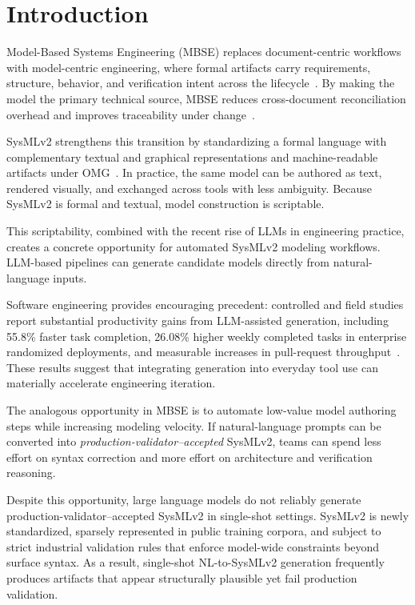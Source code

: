 \documentclass[colorlinks,upint,subscriptcorrection,varvw,hyphenate,balance]{asmeconf} %
\begin{document}

\section{Introduction}
Model-Based Systems Engineering (MBSE) replaces document-centric workflows with model-centric engineering, where formal artifacts carry requirements, structure, behavior, and verification intent across the lifecycle~\cite{estefan2007mbseSurvey,madni2018mbse,incoseMbseInitiative2025,sebokMBSE2025}. By making the model the primary technical source, MBSE reduces cross-document reconciliation overhead and improves traceability under change~\cite{madni2018mbse,incoseSEVision2035}.

SysMLv2 strengthens this transition by standardizing a formal language with complementary textual and graphical representations and machine-readable artifacts under OMG~\cite{omgSysMLv2Spec2024,omgSysMLv2About2025,omgSysMLv2FinalAdoption2025}. In practice, the same model can be authored as text, rendered visually, and exchanged across tools with less ambiguity. Because SysMLv2 is formal and textual, model construction is scriptable.

This scriptability, combined with the recent rise of LLMs in engineering practice, creates a concrete opportunity for automated SysMLv2 modeling workflows. LLM-based pipelines can generate candidate models directly from natural-language inputs.

Software engineering provides encouraging precedent: controlled and field studies report substantial productivity gains from LLM-assisted generation, including 55.8\% faster task completion, 26.08\% higher weekly completed tasks in enterprise randomized deployments, and measurable increases in pull-request throughput~\cite{peng2023copilot,cui2025highSkilled,demirer2024fieldCopilot}. These results suggest that integrating generation into everyday tool use can materially accelerate engineering iteration.

The analogous opportunity in MBSE is to automate low-value model authoring steps while increasing modeling velocity. If natural-language prompts can be converted into \emph{production-validator--accepted} SysMLv2, teams can spend less effort on syntax correction and more effort on architecture and verification reasoning.

Despite this opportunity, large language models do not reliably generate production-validator--accepted SysMLv2 in single-shot settings. SysMLv2 is newly standardized, sparsely represented in public training corpora, and subject to strict industrial validation rules that enforce model-wide constraints beyond surface syntax. As a result, single-shot NL-to-SysMLv2 generation frequently produces artifacts that appear structurally plausible yet fail production validation.
\end{document}
